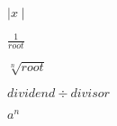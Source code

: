 \documentclass{article}
\begin{document}
$ \mid x \mid $
\pagebreak

$ \frac{1}{root} $
\pagebreak

$ \sqrt[n]{root} $
\pagebreak

$ dividend \div divisor $
\pagebreak

$ a^n $
\pagebreak
\end{document}
